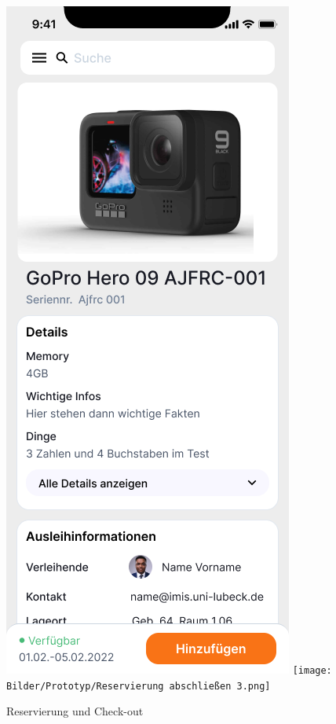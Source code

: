 \begin{figure}[h]
    \centering
    \includegraphics[scale=0.3]{Bilder/Prototyp/Neu/Datailansicht-1.png}\hspace{2em}
    \texttt{[image: Bilder/Prototyp/Reservierung abschließen 3.png]}
    \label{fig:p3}
    \caption[Reservierung und Check-out]{Reservierung und Check-out}
\end{figure}